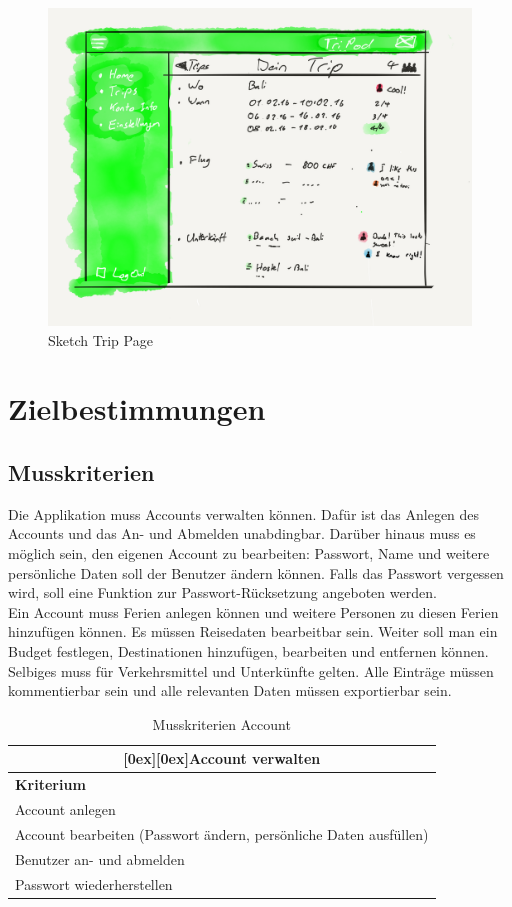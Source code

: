 \documentclass[10pt,a4paper,titlepage,twoside,german,final]{zhawreprt}
\newcommand{\tableheader}[2]{\multicolumn{#1}{c}{\raisebox{-0.3em}[0ex][0ex]{\large{\textbf{#2}}}}}
\numberwithin{table}{chapter}
\begin{document}
\begin{figure}[ht!]
  \includegraphics[width=\linewidth]{images/wire_Trip.png}
  \caption{Sketch Trip Page}
  \label{fig:TripPodLogo4}
\end{figure}


\chapter{Zielbestimmungen}\label{chp:DefinitionOfGoals}
\section{Musskriterien}\label{sec:MustCriteria}
Die Applikation muss Accounts verwalten können. Dafür ist das Anlegen des Accounts und das An- und Abmelden unabdingbar. Darüber hinaus muss es möglich sein, den eigenen Account zu bearbeiten: Passwort, Name und weitere persönliche Daten soll der Benutzer ändern können. Falls das Passwort vergessen wird, soll eine Funktion zur Passwort-Rücksetzung angeboten werden.\\
Ein Account muss Ferien anlegen können und weitere Personen zu diesen Ferien hinzufügen können. Es müssen Reisedaten bearbeitbar sein. Weiter soll man ein Budget festlegen, Destinationen hinzufügen, bearbeiten und entfernen können. Selbiges muss für Verkehrsmittel und Unterkünfte gelten. Alle Einträge müssen kommentierbar sein und alle relevanten Daten müssen exportierbar sein.
\begin{table}[ht]\centering
\begin{tabular}{l}\hline
\tableheader{1}{Account verwalten}\\[0.3em]\hline
\textbf{Kriterium}\\\hline
Account anlegen\\\hline
Account bearbeiten (Passwort ändern, persönliche Daten ausfüllen)\\\hline
Benutzer an- und abmelden\\\hline
Passwort wiederherstellen\\\hline
\end{tabular}
\caption{Musskriterien Account}\label{tbl:MustAccount}
\end{table}
\end{document}
